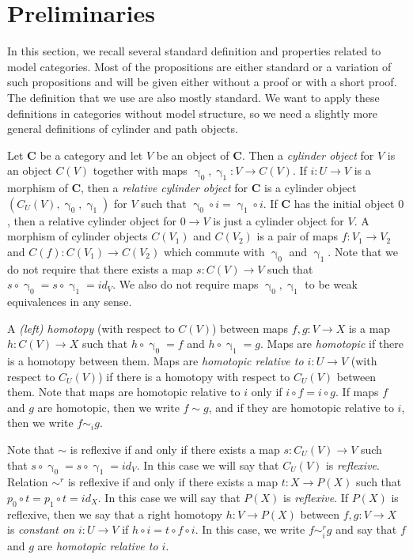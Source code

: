 \documentclass{tac}
\theoremstyle{definition}
\newcommand{\cat}[1]{\mathbf{#1}}
\newcommand{\C}{\cat{C}}
\newcommand{\cyli}{\upgamma}
\begin{document}
\section{Preliminaries}
\label{sec:preliminaries}

In this section, we recall several standard definition and properties related to model categories.
Most of the propositions are either standard or a variation of such propositions and will be given either without a proof or with a short proof.
The definition that we use are also mostly standard.
We want to apply these definitions in categories without model structure, so we need a slightly more general definitions of cylinder and path objects.

Let $\C$ be a category and let $V$ be an object of $\C$.
Then a \emph{cylinder object} for $V$ is an object $C(V)$ together with maps $\cyli_0,\cyli_1 : V \to C(V)$.
If $i : U \to V$ is a morphism of $\C$, then a \emph{relative cylinder object} for $\C$
is a cylinder object $(C_U(V),\cyli_0,\cyli_1)$ for $V$ such that $\cyli_0 \circ i = \cyli_1 \circ i$.
If $\C$ has the initial object $0$, then a relative cylinder object for $0 \to V$ is just a cylinder object for $V$.
A morphism of cylinder objects $C(V_1)$ and $C(V_2)$ is a pair of maps $f : V_1 \to V_2$ and $C(f) : C(V_1) \to C(V_2)$ which commute with $\cyli_0$ and $\cyli_1$.
Note that we do not require that there exists a map $s : C(V) \to V$ such that $s \circ \cyli_0 = s \circ \cyli_1 = id_V$.
We also do not require maps $\cyli_0,\cyli_1$ to be weak equivalences in any sense.

A \emph{(left) homotopy} (with respect to $C(V)$) between maps $f,g : V \to X$ is a map $h : C(V) \to X$ such that $h \circ \cyli_0 = f$ and $h \circ \cyli_1 = g$.
Maps are \emph{homotopic} if there is a homotopy between them.
Maps are \emph{homotopic relative to $i : U \to V$} (with respect to $C_U(V)$) if there is a homotopy with respect to $C_U(V)$ between them.
Note that maps are homotopic relative to $i$ only if $i \circ f = i \circ g$.
If maps $f$ and $g$ are homotopic, then we write $f \sim g$, and if they are homotopic relative to $i$, then we write $f \sim_i g$.

Note that $\sim$ is reflexive if and only if there exists a map $s : C_U(V) \to V$ such that $s \circ \cyli_0 = s \circ \cyli_1 = id_V$.
In this case we will say that $C_U(V)$ is \emph{reflexive}.
Relation $\sim^r$ is reflexive if and only if there exists a map $t : X \to P(X)$ such that $p_0 \circ t = p_1 \circ t = id_X$.
In this case we will say that $P(X)$ is \emph{reflexive}.
If $P(X)$ is reflexive, then we say that a right homotopy $h : V \to P(X)$ between $f,g : V \to X$
is \emph{constant on $i : U \to V$} if $h \circ i = t \circ f \circ i$.
In this case, we write $f \sim^r_i g$ and say that $f$ and $g$ are \emph{homotopic relative to $i$}.
\end{document}
